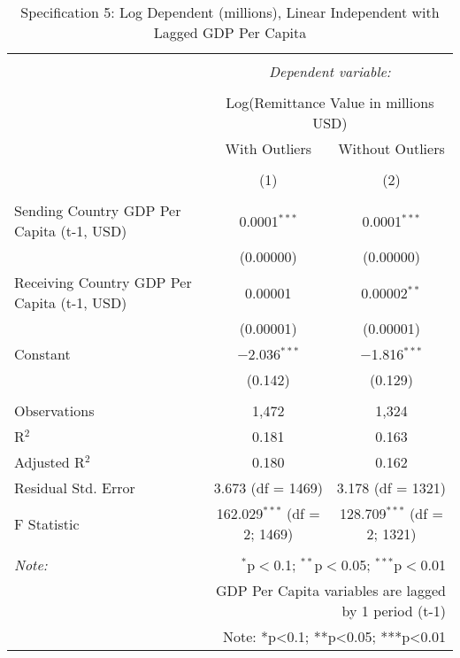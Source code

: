 
\begin{table}[!htbp] \centering 
  \caption{Specification 5: Log Dependent (millions), Linear Independent with Lagged GDP Per Capita} 
  \label{} 
\begin{tabular}{@{\extracolsep{5pt}}lcc} 
\\[-1.8ex]\hline 
\hline \\[-1.8ex] 
 & \multicolumn{2}{c}{\textit{Dependent variable:}} \\ 
\cline{2-3} 
\\[-1.8ex] & \multicolumn{2}{c}{Log(Remittance Value in millions USD)} \\ 
 & With Outliers & Without Outliers \\ 
\\[-1.8ex] & (1) & (2)\\ 
\hline \\[-1.8ex] 
 Sending Country GDP Per Capita (t-1, USD) & 0.0001$^{***}$ & 0.0001$^{***}$ \\ 
  & (0.00000) & (0.00000) \\ 
  Receiving Country GDP Per Capita (t-1, USD) & 0.00001 & 0.00002$^{**}$ \\ 
  & (0.00001) & (0.00001) \\ 
  Constant & $-$2.036$^{***}$ & $-$1.816$^{***}$ \\ 
  & (0.142) & (0.129) \\ 
 \hline \\[-1.8ex] 
Observations & 1,472 & 1,324 \\ 
R$^{2}$ & 0.181 & 0.163 \\ 
Adjusted R$^{2}$ & 0.180 & 0.162 \\ 
Residual Std. Error & 3.673 (df = 1469) & 3.178 (df = 1321) \\ 
F Statistic & 162.029$^{***}$ (df = 2; 1469) & 128.709$^{***}$ (df = 2; 1321) \\ 
\hline 
\hline \\[-1.8ex] 
\textit{Note:}  & \multicolumn{2}{r}{$^{*}$p$<$0.1; $^{**}$p$<$0.05; $^{***}$p$<$0.01} \\ 
 & \multicolumn{2}{r}{GDP Per Capita variables are lagged by 1 period (t-1)} \\ 
 & \multicolumn{2}{r}{Note: *p<0.1; **p<0.05; ***p<0.01} \\ 
\end{tabular} 
\end{table} 
